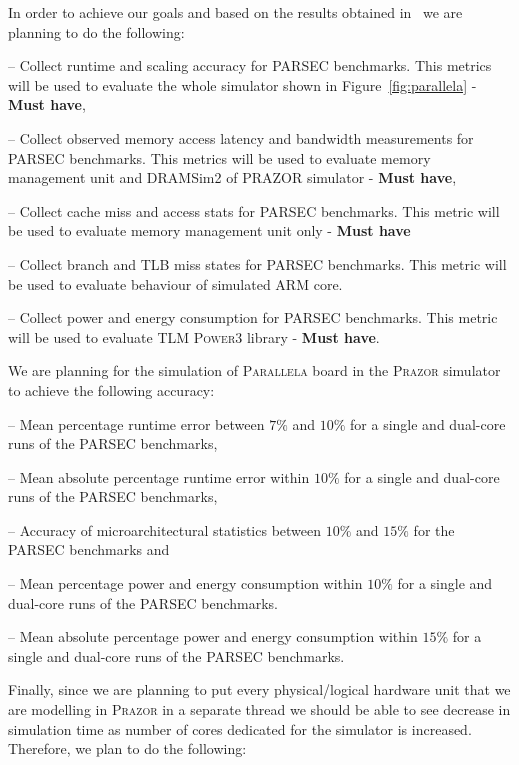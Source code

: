\documentclass{hitec}
\let\oldmarginpar\marginpar
\renewcommand\marginpar[1]{\-\oldmarginpar[\raggedleft #1]%
{\raggedright #1}}
\newenvironment{checklist}{%
  \begin{list}{}{}%
  \let\olditem\item
  \renewcommand\item{\olditem -- \marginpar{$\Box$} }
  \newcommand\checkeditem{\olditem -- \marginpar{$\CheckedBox$} }
}{%
  \end{list}
}
\begin{document}
In order to achieve our goals and based on the results obtained in~\cite{eval}
we are planning to do the following:
\begin{checklist}
\item Collect runtime and scaling accuracy for \textsc{PARSEC} benchmarks. This
  metrics will be used to evaluate the whole simulator shown in Figure~\ref{fig:parallela} -
  \textbf{Must have},
\item Collect observed memory access latency and bandwidth measurements for
  \textsc{PARSEC} benchmarks. This
  metrics will be used to evaluate memory management unit and DRAMSim2 of
  \textsc{PRAZOR} simulator - \textbf{Must have},
\item Collect cache miss and access stats for \textsc{PARSEC} benchmarks. This
  metric will be used to evaluate memory management unit only - \textbf{Must have}
\item Collect branch and TLB miss states for \textsc{PARSEC} benchmarks. This
  metric will be used to evaluate behaviour of simulated \textsc{ARM} core. 
\item Collect power and energy consumption for \textsc{PARSEC} benchmarks. This
  metric will be used to evaluate \textsc{TLM Power3} library - \textbf{Must
    have}. 
\end{checklist}

We are planning for the simulation of \textsc{Parallela} board in the
\textsc{Prazor} simulator to achieve the following accuracy:
\begin{checklist}
\item Mean percentage runtime error between $7\%$ and $10\%$ for a single and dual-core
  runs of the \textsc{PARSEC} benchmarks,
\item Mean absolute percentage runtime error within $10\%$ for a single and
  dual-core runs of the \textsc{PARSEC} benchmarks,
\item Accuracy of microarchitectural statistics between $10\%$ and $15\%$ for
  the \textsc{PARSEC} benchmarks and
\item Mean percentage power and energy consumption within $10\%$ for a single
  and dual-core runs of the \textsc{PARSEC} benchmarks.
\item Mean absolute percentage power and energy consumption within $15\%$ for a
  single and dual-core runs of the \textsc{PARSEC} benchmarks. 
\end{checklist}

Finally, since we are planning to put every physical/logical hardware
unit that we are modelling in \textsc{Prazor} in a separate thread we
should be able to see decrease in simulation time as number of cores
dedicated for the simulator is increased. Therefore, we plan to do the
following:
\end{document}
